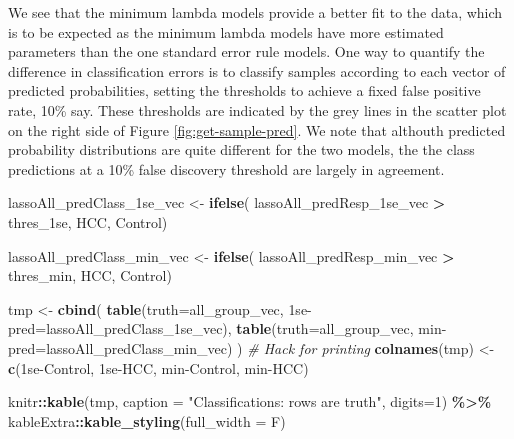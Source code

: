 \documentclass[
]{book}
\newenvironment{Shaded}{\begin{snugshade}}{\end{snugshade}}
\newcommand{\CommentTok}[1]{\textcolor[rgb]{0.56,0.35,0.01}{\textit{#1}}}
\newcommand{\DataTypeTok}[1]{\textcolor[rgb]{0.13,0.29,0.53}{#1}}
\newcommand{\DecValTok}[1]{\textcolor[rgb]{0.00,0.00,0.81}{#1}}
\newcommand{\KeywordTok}[1]{\textcolor[rgb]{0.13,0.29,0.53}{\textbf{#1}}}
\newcommand{\NormalTok}[1]{#1}
\newcommand{\OperatorTok}[1]{\textcolor[rgb]{0.81,0.36,0.00}{\textbf{#1}}}
\newcommand{\StringTok}[1]{\textcolor[rgb]{0.31,0.60,0.02}{#1}}
\begin{document}
We see that the minimum lambda models provide a better fit to the data,
which is to be expected as the minimum lambda models have more estimated
parameters than the one standard error rule models. One way to quantify
the difference in classification errors is to classify samples
according to each vector of predicted probabilities, setting
the thresholds to achieve a fixed false positive rate, 10\% say.
These thresholds are indicated by the grey lines in the scatter plot
on the right side of Figure \ref{fig:get-sample-pred}. We note
that althouth predicted probability distributions are quite different
for the two models, the the class predictions at a 10\% false discovery threshold
are largely in agreement.

\begin{Shaded}
\begin{Highlighting}[]
\NormalTok{lassoAll\_predClass\_1se\_vec <{-}}\StringTok{ }\KeywordTok{ifelse}\NormalTok{(}
\NormalTok{ lassoAll\_predResp\_1se\_vec }\OperatorTok{>}\StringTok{ }\NormalTok{thres\_1se, }\StringTok{\textquotesingle{}HCC\textquotesingle{}}\NormalTok{, }\StringTok{\textquotesingle{}Control\textquotesingle{}}\NormalTok{)}

\NormalTok{lassoAll\_predClass\_min\_vec <{-}}\StringTok{ }\KeywordTok{ifelse}\NormalTok{(}
\NormalTok{ lassoAll\_predResp\_min\_vec }\OperatorTok{>}\StringTok{ }\NormalTok{thres\_min, }\StringTok{\textquotesingle{}HCC\textquotesingle{}}\NormalTok{, }\StringTok{\textquotesingle{}Control\textquotesingle{}}\NormalTok{)}

\NormalTok{tmp <{-}}\StringTok{ }\KeywordTok{cbind}\NormalTok{(}
 \KeywordTok{table}\NormalTok{(}\DataTypeTok{truth=}\NormalTok{all\_group\_vec, }\StringTok{\textasciigrave{}}\DataTypeTok{1se{-}pred}\StringTok{\textasciigrave{}}\NormalTok{=lassoAll\_predClass\_1se\_vec),}
 \KeywordTok{table}\NormalTok{(}\DataTypeTok{truth=}\NormalTok{all\_group\_vec, }\StringTok{\textasciigrave{}}\DataTypeTok{min{-}pred}\StringTok{\textasciigrave{}}\NormalTok{=lassoAll\_predClass\_min\_vec)}
\NormalTok{) }
\CommentTok{\# Hack for printing}
\KeywordTok{colnames}\NormalTok{(tmp) <{-}}\StringTok{ }\KeywordTok{c}\NormalTok{(}\StringTok{\textquotesingle{}1se{-}Control\textquotesingle{}}\NormalTok{, }\StringTok{\textquotesingle{}1se{-}HCC\textquotesingle{}}\NormalTok{, }\StringTok{\textquotesingle{}min{-}Control\textquotesingle{}}\NormalTok{, }\StringTok{\textquotesingle{}min{-}HCC\textquotesingle{}}\NormalTok{)}

\NormalTok{knitr}\OperatorTok{::}\KeywordTok{kable}\NormalTok{(tmp,}
  \DataTypeTok{caption =} \StringTok{"Classifications: rows are truth"}\NormalTok{,}
  \DataTypeTok{digits=}\DecValTok{1}\NormalTok{) }\OperatorTok{\%>\%}
\StringTok{   }\NormalTok{kableExtra}\OperatorTok{::}\KeywordTok{kable\_styling}\NormalTok{(}\DataTypeTok{full\_width =}\NormalTok{ F)}
\end{Highlighting}
\end{Shaded}
\end{document}
